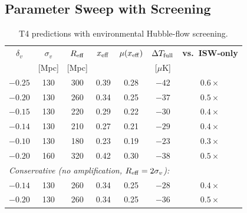\documentclass[11pt,a4paper]{article}
\newcommand{\mufd}{\mu}
\begin{document}
\subsection{Parameter Sweep with Screening}

\begin{table}[H]
\centering
\caption{T4 predictions with environmental Hubble-flow screening.}
\label{tab:T4-screened}
\begin{tabular}{ccccccc}
\toprule
$\delta_v$ & $\sigma_v$ & $R_{\rm eff}$ & $x_{\rm eff}$
& $\mufd(x_{\rm eff})$ & $\Delta T_{\rm full}$ &
\textbf{vs.\ ISW-only} \\
& [Mpc] & [Mpc] & & & [$\mu$K] & \\
\midrule
$-0.25$ & 130 & 300 & 0.39 & 0.28 & $-42$ & $0.6\times$ \\
$-0.20$ & 130 & 260 & 0.34 & 0.25 & $-37$ & $0.5\times$ \\
$-0.15$ & 130 & 220 & 0.29 & 0.22 & $-30$ & $0.4\times$ \\
$-0.14$ & 130 & 210 & 0.27 & 0.21 & $-29$ & $0.4\times$ \\
$-0.10$ & 130 & 180 & 0.23 & 0.19 & $-23$ & $0.3\times$ \\
$-0.20$ & 160 & 320 & 0.42 & 0.30 & $-38$ & $0.5\times$ \\
\midrule
\multicolumn{7}{l}{\textit{Conservative (no amplification, $R_{\rm eff} = 2\sigma_v$):}} \\
$-0.14$ & 130 & 260 & 0.34 & 0.25 & $-28$ & $0.4\times$ \\
$-0.20$ & 130 & 260 & 0.34 & 0.25 & $-36$ & $0.5\times$ \\
\bottomrule
\end{tabular}
\end{table}
\end{document}
